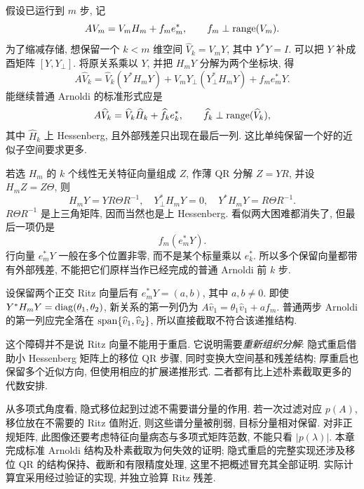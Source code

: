 假设已运行到 $m$ 步, 记
\begin{equation}\label{eq:arnoldi-before-restart}
AV_m=V_mH_m+f_me_m^*,\qquad f_m\perp\operatorname{range}(V_m).
\end{equation}
为了缩减存储, 想保留一个 $k<m$ 维空间 $\widehat V_k=V_mY$, 其中 $Y^*Y=I$. 可以把 $Y$ 补成酉矩阵 $[Y,Y_\perp]$. 将原关系乘以 $Y$, 并把 $H_mY$ 分解为两个坐标块, 得
\begin{equation}\label{eq:restart-full}
A\widehat V_k
=\widehat V_k(Y^*H_mY)
+V_mY_\perp(Y_\perp^*H_mY)
+f_me_m^*Y.
\end{equation}
能继续普通 Arnoldi 的标准形式应是
\[
A\widehat V_k=\widehat V_k\widehat H_k+\widehat f_ke_k^*,
\qquad \widehat f_k\perp\operatorname{range}(\widehat V_k),
\]
其中 $\widehat H_k$ 上 Hessenberg, 且外部残差只出现在最后一列. 这比单纯保留一个好的近似子空间要求更多.

若选 $H_m$ 的 $k$ 个线性无关特征向量组成 $Z$, 作薄 QR 分解 $Z=YR$, 并设 $H_mZ=Z\Theta$, 则
\[
H_mY=YR\Theta R^{-1},\quad
Y_\perp^*H_mY=0,\quad
Y^*H_mY=R\Theta R^{-1}.
\]
$R\Theta R^{-1}$ 是上三角矩阵, 因而当然也是上 Hessenberg. 看似两大困难都消失了, 但最后一项仍是
\[
f_m(e_m^*Y).
\]
行向量 $e_m^*Y$ 一般在多个位置非零, 而不是某个标量乘以 $e_k^*$. 所以多个保留向量都带有外部残差, 不能把它们原样当作已经完成的普通 Arnoldi 前 $k$ 步.

\begin{example}
设保留两个正交 Ritz 向量后有 $e_m^*Y=(a,b)$, 其中 $a,b\ne0$. 即使 $Y^*H_mY=\operatorname{diag}(\theta_1,\theta_2)$, 新关系的第一列仍为
$A\widehat v_1=\theta_1\widehat v_1+a f_m$.
普通两步 Arnoldi 的第一列应完全落在 $\operatorname{span}\{\widehat v_1,\widehat v_2\}$, 所以直接截取不符合该递推结构.
\end{example}
这个障碍并不是说 Ritz 向量不能用于重启. 它说明需要\emph{重新组织分解}: 隐式重启借助小 Hessenberg 矩阵上的移位 QR 步骤, 同时变换大空间基和残差结构; 厚重启也保留多个近似方向, 但使用相应的扩展递推形式. 二者都有比上述朴素截取更多的代数安排.

从多项式角度看, 隐式移位起到过滤不需要谱分量的作用. 若一次过滤对应 $p(A)$, 移位放在不需要的 Ritz 值附近, 则这些谱分量被削弱, 目标分量相对保留. 对非正规矩阵, 此图像还要考虑特征向量病态与多项式矩阵范数, 不能只看 $|p(\lambda)|$. 本章完成标准 Arnoldi 结构及朴素截取为何失效的证明; 隐式重启的完整实现还涉及移位 QR 的结构保持、截断和有限精度处理, 这里不把概述冒充其全部证明. 实际计算宜采用经过验证的实现, 并独立验算 Ritz 残差.

